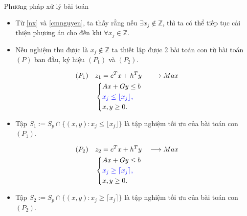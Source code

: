 \documentclass{beamer}
\begin{document}
\begin{frame}{Phương pháp xử lý bài toán}
\large
\begin{itemize}
\item Từ \eqref{nx} và \eqref{cmnguyen}, ta thấy rằng nếu $\exists x_j \notin \mathbb{Z}$, thì ta có thể tiếp tục cải thiện phương án cho đến khi $\forall x_j \in \mathbb{Z}$. 
\item Nếu nghiệm thu được là $x_j \notin \mathbb{Z}$ ta thiết lập được 2 bài toán con từ bài toán $(P)$ ban đầu, ký hiệu $(P_1)$ và $(P_2)$.
\end{itemize}
\end{frame}

\begin{frame}
\begin{equation}
    \begin{split}
    (P_1) \quad & z_1=c^Tx+h^Ty \quad \longrightarrow Max \\
                & \left\{\begin{split}
                    &Ax+Gy \leq  b \\
                    &\color{blue} x_j \leq \lfloor x_j \rfloor , \\
                    &x,y \geq 0.
                \end{split}\right.    
    \end{split}
\end{equation}
\begin{itemize}
\item Tập $S_1:=S_p \cap \{ (x,y): x_j \leq \lfloor x_j \rfloor \}$ là tập nghiệm tối ưu của bài toán con $(P_1)$.
\end{itemize}
\end{frame}

\begin{frame}
\begin{equation}
    \begin{split}
    (P_2) \quad & z_2=c^Tx+h^Ty \quad \longrightarrow Max \\
                & \left\{\begin{split}
                    &Ax+Gy \leq  b \\
                    &\color{blue} x_j \geq \lceil x_j \rceil , \\
                    &x,y \geq 0.
                \end{split}\right.    
    \end{split}
\end{equation}
\begin{itemize}
\item Tập $S_2:=S_p \cap \{ (x,y): x_j \geq \lceil x_j \rceil \}$ là tập nghiệm tối ưu của bài toán con $(P_2)$.
\end{itemize}
\end{frame}
\end{document}
